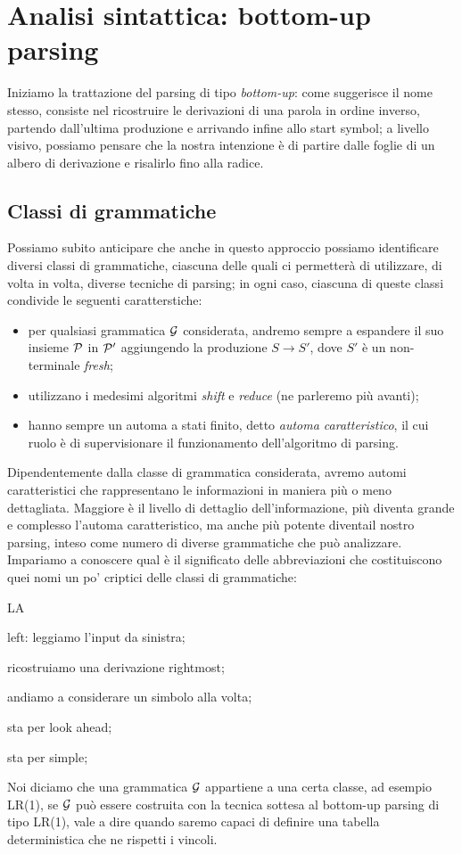 \documentclass[class=book, crop=false, oneside, 12pt]{standalone}
\begin{document}
\chapter{Analisi sintattica: bottom-up parsing}
Iniziamo la trattazione del parsing di tipo \emph{bottom-up}: come suggerisce il nome stesso, consiste nel ricostruire le derivazioni di una parola in ordine inverso, partendo dall'ultima produzione e arrivando infine allo start symbol; a livello visivo, possiamo pensare che la nostra intenzione è di partire dalle foglie di un albero di derivazione e risalirlo fino alla radice.

\section{Classi di grammatiche}
Possiamo subito anticipare che anche in questo approccio possiamo identificare diversi classi di grammatiche, ciascuna delle quali ci permetterà di utilizzare, di volta in volta, diverse tecniche di parsing; in ogni caso, ciascuna di queste classi condivide le seguenti caratterstiche:
\begin{itemize}
    \item per qualsiasi grammatica \(\G\) considerata, andremo sempre a espandere il suo insieme \(\P\) in \(\P'\) aggiungendo la produzione \(S \to S'\), dove \(S'\) è un non-terminale \emph{fresh};
    \item utilizzano i medesimi algoritmi \emph{shift} e \emph{reduce} (ne parleremo più avanti);
    \item hanno sempre un automa a stati finito, detto \emph{automa caratteristico}, il cui ruolo è di supervisionare il funzionamento dell'algoritmo di parsing.
\end{itemize}
Dipendentemente dalla classe di grammatica considerata, avremo automi caratteristici che rappresentano le informazioni in maniera più o meno dettagliata. Maggiore è il livello di dettaglio dell'informazione, più diventa grande e complesso l'automa caratteristico, ma anche più potente diventail nostro parsing, inteso come numero di diverse grammatiche che può analizzare. Impariamo a conoscere qual è il significato delle abbreviazioni che costituiscono quei nomi un po' criptici delle classi di grammatiche:
\begin{labeling}{LA}
    \item[L] left: leggiamo l'input da sinistra;
    \item[R] ricostruiamo una derivazione rightmost;
    \item[1] andiamo a considerare un simbolo alla volta;
    \item[LA] sta per look ahead;
    \item[S] sta per simple;  
\end{labeling}
Noi diciamo che una grammatica \(\G\) appartiene a una certa classe, ad esempio LR(1), se \(\G\) può essere costruita con la tecnica sottesa al bottom-up parsing di tipo LR(1), vale a dire quando saremo capaci di definire una tabella deterministica che ne rispetti i vincoli.
\end{document}
